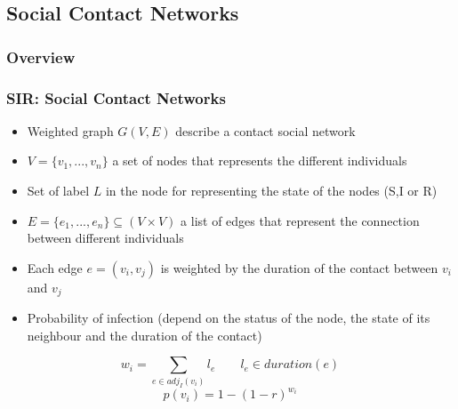 \documentclass{beamer}
\begin{document}
\subsection{Social Contact Networks}


\begin{frame}
\frametitle{Overview} %
\tableofcontents[currentsection] %
\end{frame}
\begin{frame}
\frametitle{SIR: Social Contact Networks}
\begin{itemize}
\item Weighted graph $G(V,E)$ describe a contact social network
\item $V=\{v_1,...,v_n\}$ a set of nodes that represents the different individuals
\item Set of label $L$ in the node for representing the state of the nodes (S,I or R)
\item $E=\{e_1,...,e_n\}\subseteq (V \times V)$ a list of edges that represent the connection between different individuals
\item Each edge $e=(v_i,v_j)$ is weighted by the duration of the contact between $v_i$ and $v_j$
\item Probability of infection (depend on the status of the node, the state of its neighbour and the duration of the contact) 
\end{itemize}
\begin{equation}
w_i=\sum_{e\in adj_I(v_i)} l_e \qquad l_e \in duration(e)  \nonumber
\end{equation} 
\begin{equation}
p(v_i)=1-(1-r)^{w_i}
\end{equation}
\end{frame}
\end{document}
